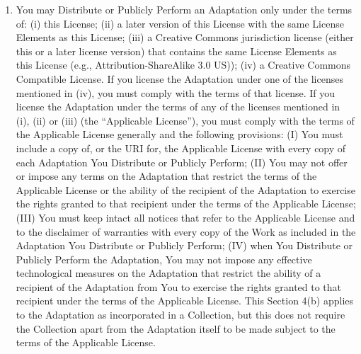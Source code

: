 \begin{enumerate}
\item You may Distribute or Publicly Perform an Adaptation
  only under the terms of: (i) this License; (ii) a later
  version of this License with the same License Elements as
  this License; (iii) a Creative Commons jurisdiction
  license (either this or a later license version) that
  contains the same License Elements as this License (e.g.,
  Attribution-ShareAlike 3.0 US)); (iv) a Creative Commons
  Compatible License. If you license the Adaptation under
  one of the licenses mentioned in (iv), you must comply
  with the terms of that license. If you license the
  Adaptation under the terms of any of the licenses
  mentioned in (i), (ii) or (iii) (the ``Applicable
  License''), you must comply with the terms of the
  Applicable License generally and the following
  provisions: (I) You must include a copy of, or the URI
  for, the Applicable License with every copy of each
  Adaptation You Distribute or Publicly Perform; (II) You
  may not offer or impose any terms on the Adaptation that
  restrict the terms of the Applicable License or the
  ability of the recipient of the Adaptation to exercise
  the rights granted to that recipient under the terms of
  the Applicable License; (III) You must keep intact all
  notices that refer to the Applicable License and to the
  disclaimer of warranties with every copy of the Work as
  included in the Adaptation You Distribute or Publicly
  Perform; (IV) when You Distribute or Publicly Perform the
  Adaptation, You may not impose any effective
  technological measures on the Adaptation that restrict
  the ability of a recipient of the Adaptation from You to
  exercise the rights granted to that recipient under the
  terms of the Applicable License. This Section 4(b)
  applies to the Adaptation as incorporated in a
  Collection, but this does not require the Collection
  apart from the Adaptation itself to be made subject to
  the terms of the Applicable License.


\end{enumerate}
